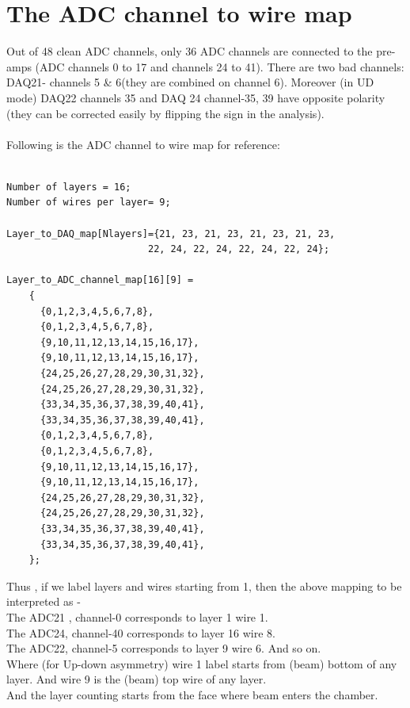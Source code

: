 \documentclass[12pt]{article}
\begin{document}
\section{The ADC channel to wire map}
Out of 48 clean ADC channels, only 36 ADC channels are connected to the pre-amps (ADC channels 0 to 17 and channels 24 to 41). There are two bad channels: DAQ21- channels 5 \& 6(they are combined on channel 6). Moreover (in UD mode) DAQ22 channels 35 and DAQ 24 channel-35, 39 have opposite polarity (they can be corrected easily by flipping the sign in the analysis). \\
 \\
Following is the ADC channel to wire map for reference:
\begin{lstlisting}

Number of layers = 16;
Number of wires per layer= 9;

Layer_to_DAQ_map[Nlayers]={21, 23, 21, 23, 21, 23, 21, 23,
                         22, 24, 22, 24, 22, 24, 22, 24};

Layer_to_ADC_channel_map[16][9] =
    {
      {0,1,2,3,4,5,6,7,8},
      {0,1,2,3,4,5,6,7,8},
      {9,10,11,12,13,14,15,16,17},
      {9,10,11,12,13,14,15,16,17},
      {24,25,26,27,28,29,30,31,32},
      {24,25,26,27,28,29,30,31,32},
      {33,34,35,36,37,38,39,40,41},
      {33,34,35,36,37,38,39,40,41},
      {0,1,2,3,4,5,6,7,8},
      {0,1,2,3,4,5,6,7,8},
      {9,10,11,12,13,14,15,16,17},
      {9,10,11,12,13,14,15,16,17},
      {24,25,26,27,28,29,30,31,32},
      {24,25,26,27,28,29,30,31,32},
      {33,34,35,36,37,38,39,40,41},
      {33,34,35,36,37,38,39,40,41},
    };
\end{lstlisting}
Thus , if we label layers and wires starting from 1, then the above mapping to be interpreted as - \\
The ADC21 , channel-0 corresponds to layer 1 wire 1. \\
The ADC24, channel-40 corresponds to layer 16 wire 8.\\
The ADC22, channel-5 corresponds to layer 9 wire 6. And so on.\\  
Where (for Up-down asymmetry) wire 1 label starts from (beam) bottom of any layer. And wire 9 is the (beam) top wire of any layer.\\
And the layer counting starts from the face where beam enters the chamber. \\
\end{document}
